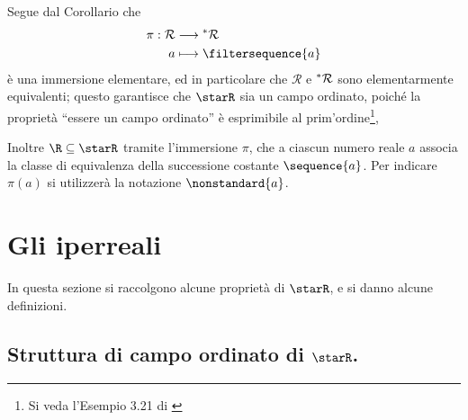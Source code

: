     Segue dal Corollario  che \begin{align*}
    \pi: \mathcal{R} &\longrightarrow  \null^{*}\mathcal{R}\\
    a &\longmapsto \filtersequence{a}
    \end{align*}è una immersione elementare, ed in particolare che $ \mathcal{R} $ e $ \null^{*} \mathcal{R} $ sono elementarmente equivalenti; questo garantisce che $ \starR $ sia un campo ordinato, poiché la proprietà ``essere un campo ordinato'' è esprimibile al prim'ordine\footnote{Si veda l'Esempio 3.21 di \cite{andretta_elements_2022}},
    
    Inoltre $ \R \subseteq \starR $ tramite l'immersione $ \pi $, che a ciascun numero reale $ a $ associa la classe di equivalenza della successione costante $ \sequence{a} $. Per indicare $ \pi(a) $ si utilizzerà la notazione $ \nonstandard{a} $.




\section{Gli iperreali}

In questa sezione si raccolgono alcune proprietà di $ \starR $, e si danno alcune definizioni.

\subsection{Struttura di campo ordinato di $ \starR $.}



